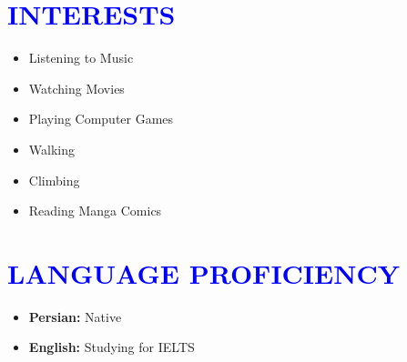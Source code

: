 \documentclass[letterpaper,11pt]{article}
\newcommand{\resumeSubHeadingListStart}{\begin{itemize}[leftmargin=0.0in, label={}]}
\newcommand{\resumeSubHeadingListEnd}{\end{itemize}}
\begin{document}
\section{\textcolor{blue}{INTERESTS}}
        \begin{multicols}{4}
            \begin{itemize}[itemsep=-2pt, parsep=5pt]
                \item Listening to Music
                \item Watching Movies
                \item Playing Computer Games
                \item Walking
                \item Climbing
                \item Reading Manga Comics
            \end{itemize}
            
        \end{multicols}
    
\section{\textcolor{blue}{LANGUAGE PROFICIENCY}}
        \begin{itemize}[itemsep=-2pt, parsep=5pt]
            \item \textbf{Persian:} Native
            \item \textbf{English:} Studying for IELTS
        \end{itemize}
 
\end{document}
